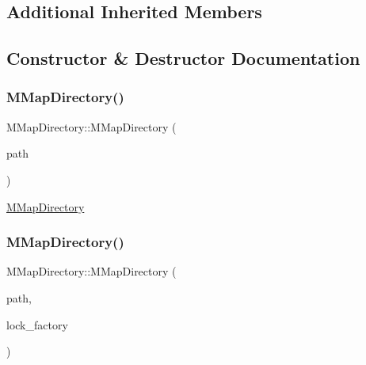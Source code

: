 \subsection*{Additional Inherited Members}


\subsection{Constructor \& Destructor Documentation}
\mbox{\label{classlucene_1_1core_1_1store_1_1MMapDirectory_a92290f8e78a93ef15e58c8e114fc0fa3}} 
\subsubsection{\texorpdfstring{M\+Map\+Directory()}{MMapDirectory()}\hspace{0.1cm}{\footnotesize\ttfamily [1/2]}}
{\footnotesize\ttfamily M\+Map\+Directory\+::\+M\+Map\+Directory (\begin{DoxyParamCaption}\item[{\mbox{\hyperlink{ZlibCrc32_8h_a2c212835823e3c54a8ab6d95c652660e}{const}} std\+::string \&}]{path }\end{DoxyParamCaption})\hspace{0.3cm}{\ttfamily [explicit]}}

\mbox{\hyperlink{classlucene_1_1core_1_1store_1_1MMapDirectory}{M\+Map\+Directory}} \mbox{\label{classlucene_1_1core_1_1store_1_1MMapDirectory_a8270d1bc0f9d410c19eac95e8ef8ea48}} 
\subsubsection{\texorpdfstring{M\+Map\+Directory()}{MMapDirectory()}\hspace{0.1cm}{\footnotesize\ttfamily [2/2]}}
{\footnotesize\ttfamily M\+Map\+Directory\+::\+M\+Map\+Directory (\begin{DoxyParamCaption}\item[{\mbox{\hyperlink{ZlibCrc32_8h_a2c212835823e3c54a8ab6d95c652660e}{const}} std\+::string \&}]{path,  }\item[{\mbox{\hyperlink{ZlibCrc32_8h_a2c212835823e3c54a8ab6d95c652660e}{const}} std\+::shared\+\_\+ptr$<$ \mbox{\hyperlink{classlucene_1_1core_1_1store_1_1LockFactory}{Lock\+Factory}} $>$ \&}]{lock\+\_\+factory }\end{DoxyParamCaption})}



